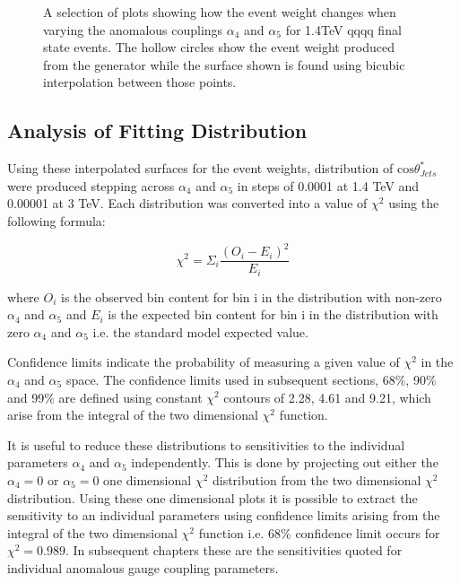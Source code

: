 \begin{figure}
\caption[Event weights from Whizard for 1.4TeV \nu{\nu}qqqq final state events with interpolated surface.]{A selection of plots showing how the event weight changes when varying the anomalous couplings $\alpha_{4}$ and $\alpha_{5}$ for 1.4TeV \nu{\nu}qqqq final state events.  The hollow circles show the event weight produced from the generator while the surface shown is found using bicubic interpolation between those points.}
\label{fig:eventweights1400interpolated}
\end{figure}

\subsection{Analysis of Fitting Distribution}
Using these interpolated surfaces for the event weights, distribution of $\text{cos}\theta^{*}_{Jets}$ were produced stepping across $\alpha_{4}$ and $\alpha_{5}$ in steps of 0.0001 at 1.4 TeV and 0.00001 at 3 TeV.  Each distribution was converted into a value of $\chi^{2}$ using the following formula:

\begin{equation}
\chi^{2} = \Sigma_{i} \frac{(O_{i} - E_{i})^{2}}{E_{i}}
\end{equation}

where $O_{i}$ is the observed bin content for bin i in the distribution with non-zero $\alpha_{4}$ and $\alpha_{5}$ and $E_{i}$ is the expected bin content for bin i in the distribution with zero $\alpha_{4}$ and $\alpha_{5}$ i.e. the standard model expected value.

Confidence limits indicate the probability of measuring a given value of $\chi^{2}$ in the $\alpha_{4}$ and $\alpha_{5}$ space.  The confidence limits used in subsequent sections, 68\%, 90\% and 99\% are defined using constant $\chi^{2}$ contours of 2.28, 4.61 and 9.21, which arise from the integral of the two dimensional $\chi^{2}$ function.

It is useful to reduce these distributions to sensitivities to the individual parameters $\alpha_{4}$ and $\alpha_{5}$ independently.  This is done by projecting out either the $\alpha_{4} = 0$ or $\alpha_{5} = 0$ one dimensional $\chi^{2}$ distribution from the two dimensional $\chi^{2}$ distribution.  Using these one dimensional plots it is possible to extract the sensitivity to an individual parameters using confidence limits arising from the integral of the two dimensional $\chi^{2}$ function i.e. 68\% confidence limit occurs for $\chi^{2} = 0.989$.  In subsequent chapters these are the sensitivities quoted for individual anomalous gauge coupling parameters. 

